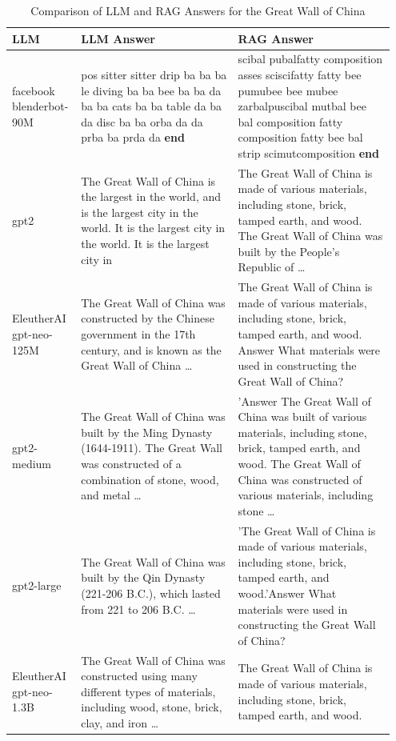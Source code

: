 \documentclass{wseas}
\begin{document}
\begin{table}[htbp]
\centering
\begin{tabular}{|p{0.15\linewidth}|p{0.4\linewidth}|p{0.4\linewidth}|}
\hline
\textbf{LLM} & \textbf{LLM Answer} & \textbf{RAG Answer} \\ \hline
facebook blenderbot-90M & pos sitter sitter drip ba ba ba le diving ba ba bee ba ba da ba ba cats ba ba table da ba da disc ba ba orba da da prba ba prda da \textbf{end} & scibal pubalfatty composition asses sciscifatty fatty bee pumubee bee mubee zarbalpuscibal mutbal bee bal composition fatty composition fatty bee bal strip scimutcomposition \textbf{end} \\ \hline
gpt2 & The Great Wall of China is the largest in the world, and is the largest city in the world. It is the largest city in the world. It is the largest city in & The Great Wall of China is made of various materials, including stone, brick, tamped earth, and wood. The Great Wall of China was built by the People's Republic of \ldots{} \\ \hline
EleutherAI gpt-neo-125M & The Great Wall of China was constructed by the Chinese government in the 17th century, and is known as the Great Wall of China \ldots{} & The Great Wall of China is made of various materials, including stone, brick, tamped earth, and wood. Answer What materials were used in constructing the Great Wall of China? \\ \hline
gpt2-medium & The Great Wall of China was built by the Ming Dynasty (1644-1911). The Great Wall was constructed of a combination of stone, wood, and metal \ldots{} & 'Answer The Great Wall of China was built of various materials, including stone, brick, tamped earth, and wood. The Great Wall of China was constructed of various materials, including stone \ldots{} \\ \hline
gpt2-large & The Great Wall of China was built by the Qin Dynasty (221-206 B.C.), which lasted from 221 to 206 B.C. \ldots{} & 'The Great Wall of China is made of various materials, including stone, brick, tamped earth, and wood.'Answer What materials were used in constructing the Great Wall of China? \\ \hline
EleutherAI gpt-neo-1.3B & The Great Wall of China was constructed using many different types of materials, including wood, stone, brick, clay, and iron \ldots{} & The Great Wall of China is made of various materials, including stone, brick, tamped earth, and wood. \\ \hline
\end{tabular}
\caption{Comparison of LLM and RAG Answers for the Great Wall of China}
\end{table}
\end{document}
